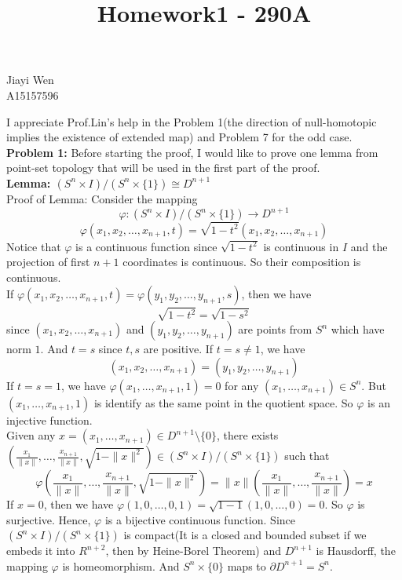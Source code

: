 \documentclass[12pt]{amsart}
\begin{document}
\title{Homework1 - 290A}
\maketitle
\begin{center}
    Jiayi Wen\\
    A15157596
\end{center}
I appreciate Prof.Lin's help in the Problem 1(the direction of null-homotopic implies the existence of extended map) and Problem 7 for the odd case.\\
\textbf{Problem 1:}
Before starting the proof, I would like to prove one lemma from point-set topology that will be used in the first part of the proof.\\
\textbf{Lemma: $(S^n\times I)/(S^n\times \{1\})\cong D^{n+1}$}\\
Proof of Lemma: Consider the mapping
$$\varphi: (S^n\times I)/(S^n\times \{1\})\rightarrow D^{n+1}$$
\[\varphi(x_1,x_2,\dots,x_{n+1},t)=\sqrt{1-t^2} (x_1,x_2,\dots,x_{n+1})\]
Notice that $\varphi$ is a continuous function since $\sqrt{1-t^2}$ is continuous in $I$ and the projection of first $n+1$ coordinates is continuous. So their composition is continuous.\\
If $\varphi(x_1,x_2,\dots,x_{n+1},t)=\varphi(y_1,y_2,\dots,y_{n+1},s)$, then we have
\[\sqrt{1-t^2}=\sqrt{1-s^2}\]
since $(x_1,x_2,\dots,x_{n+1})$ and $(y_1,y_2,\dots,y_{n+1})$ are points from $S^n$ which have norm $1$. And $t=s$ since $t,s$ are positive. If $t=s\neq 1$, we have
\[(x_1,x_2,\dots,x_{n+1})=(y_1,y_2,\dots,y_{n+1})\]
If $t=s=1$, we have $\varphi(x_1,\dots,x_{n+1},1)=0$ for any $(x_1,\dots,x_{n+1})\in S^n$. But $(x_1,\dots,x_{n+1},1)$ is identify as the same point in the quotient space. So $\varphi$ is an injective function.\\
Given any $x=(x_1,\dots,x_{n+1})\in D^{n+1}\setminus\{0\}$, there exists $(\frac{x_1}{\|x\|},\dots,\frac{x_{n+1}}{\|x\|},\sqrt{1-\|x\|^2})\in(S^n\times I)/(S^n\times \{1\})$ such that
\[\varphi(\frac{x_1}{\|x\|},\dots,\frac{x_{n+1}}{\|x\|},\sqrt{1-\|x\|^2})=\|x\|(\frac{x_1}{\|x\|},\dots,\frac{x_{n+1}}{\|x\|})=x\]
If $x=0$, then we have $\varphi(1,0,\dots,0,1)=\sqrt{1-1}(1,0,\dots,0)=0$. So $\varphi$ is surjective. Hence, $\varphi$ is a bijective continuous function. Since $(S^n\times I)/(S^n\times \{1\})$ is compact(It is a closed and bounded subset if we embeds it into $R^{n+2}$, then by Heine-Borel Theorem) and $D^{n+1}$ is Hausdorff, the mapping $\varphi$ is homeomorphism. And $S^n\times\{0\}$ maps to $\partial D^{n+1}=S^n$.
\\
\end{document}
